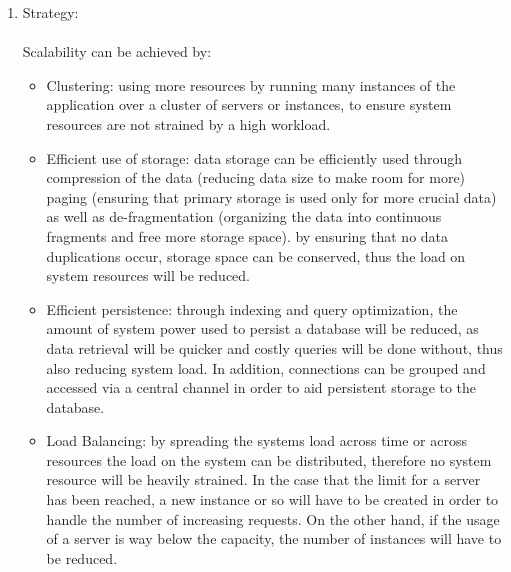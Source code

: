		\begin{enumerate}
			\item Strategy:\\\\
			Scalability can be achieved by:
			\begin{itemize}
			\item Clustering: using more resources by running many instances of the application over a cluster of servers or instances, to ensure system resources are not strained by a high workload.
			
			\item Efficient use of storage: data storage can be efficiently used through compression of the data (reducing data size to make room for more) paging (ensuring that primary storage is used only for more crucial data) as well as de-fragmentation (organizing the data into continuous fragments and free more storage space).
			by ensuring that no data duplications occur, storage space can be conserved, thus the load on system resources will be reduced.
			\item Efficient persistence: through indexing and query optimization, the amount of system power used to persist a database will be reduced, as data retrieval will be quicker and costly queries will be done without, thus also reducing system load. In addition, connections can be grouped and accessed via a central channel in order to aid persistent storage to the database.
			
			\item Load Balancing: by spreading the systems load across time or across resources the load on the system can be distributed, therefore no system resource will be heavily strained. In the case that the limit for a server has been reached, a new instance or so will have to be created in order to handle the number of increasing requests. On the other hand, if the usage of a server is way below the capacity, the number of instances will have to be reduced.
			

\end{itemize}
\end{enumerate}
